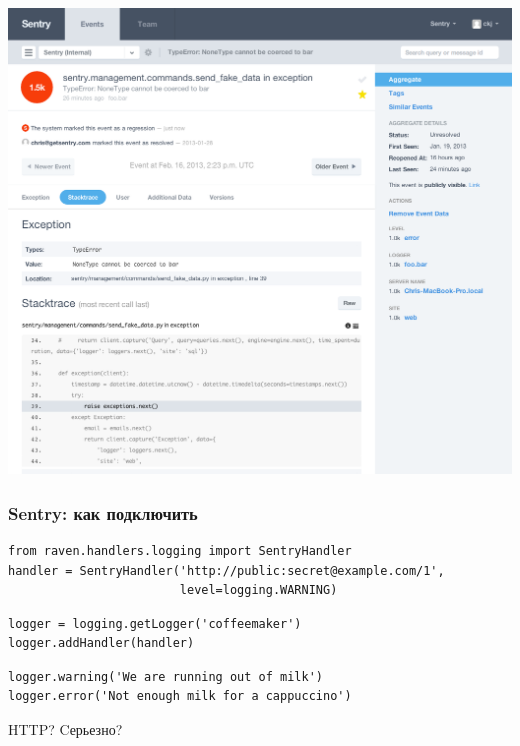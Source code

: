 \documentclass[aspectratio=169]{beamer}
\begin{document}
\begin{frame}
  \begin{center}
    \includegraphics[scale=0.23]{img/sentry2.png}
  \end{center}
\end{frame}


\begin{frame}[fragile]
  \frametitle{Sentry: как подключить}
  \begin{lstlisting}
from raven.handlers.logging import SentryHandler
handler = SentryHandler('http://public:secret@example.com/1',
                        level=logging.WARNING)
  \end{lstlisting}
  \vspace{0.5cm}
  \pause
  \begin{lstlisting}[firstnumber=4]
logger = logging.getLogger('coffeemaker')
logger.addHandler(handler)
  \end{lstlisting}
  \vspace{0.5cm}
  \pause
  \begin{lstlisting}[firstnumber=6]
logger.warning('We are running out of milk')
logger.error('Not enough milk for a cappuccino')
  \end{lstlisting}
  
  \pause
  \vspace{0.7cm}

\begin{center}
    {\color{WGred} HTTP? Cерьезно?}
\end{center}

\end{frame}
\end{document}
